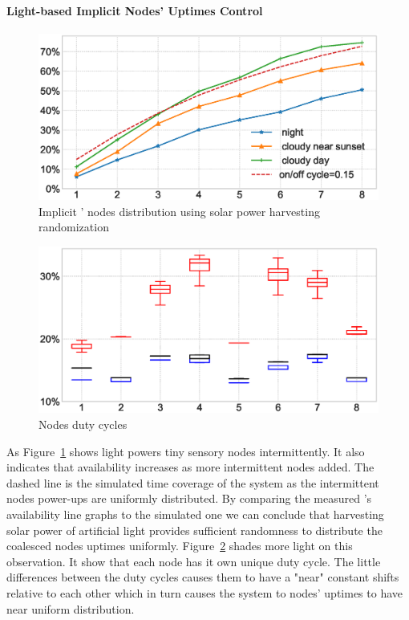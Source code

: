 \paragraph{Light-based Implicit Nodes' Uptimes Control}
%
\begin{figure}[t]
		\centering
		\includegraphics[width=\columnwidth]{figures/sysAvailability}
		\caption{Implicit \fullsys' nodes distribution using solar power harvesting randomization}
		\label{fig:solarPwrCoIS}
\end{figure} 
%
\begin{figure}[t]
		\centering
		\includegraphics[width=\columnwidth]{figures/sysDutyCycles}
		\caption{ Nodes duty cycles}
		\label{fig:sysDutyCycle}
\end{figure} 
%
As Figure~\ref{fig:solarPwrCoIS} shows light powers tiny sensory nodes intermittently. It also indicates that \sys availability increases as more intermittent nodes added. The dashed line is the simulated time coverage of the system as the intermittent nodes power-ups are uniformly distributed. By comparing the measured \sys's availability line graphs to the simulated one we can conclude that harvesting solar power of artificial light provides sufficient randomness to distribute the coalesced nodes uptimes uniformly. Figure~\ref{fig:sysDutyCycle} shades more light on this observation. It show that each node has it own unique duty cycle. The little differences between the duty cycles causes them to have a "near" constant shifts relative to each other which in turn causes the system to nodes' uptimes to have near uniform distribution.

